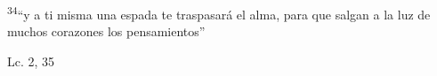 \documentclass[../../rosario.tex]{subfiles}
\begin{document}
    \textsuperscript{34}``y a ti misma una espada te traspasará el alma, para que salgan a la luz de muchos corazones los pensamientos''
    \begin{flushright}
    Lc. 2, 35         
    \end{flushright} 
\end{document}

